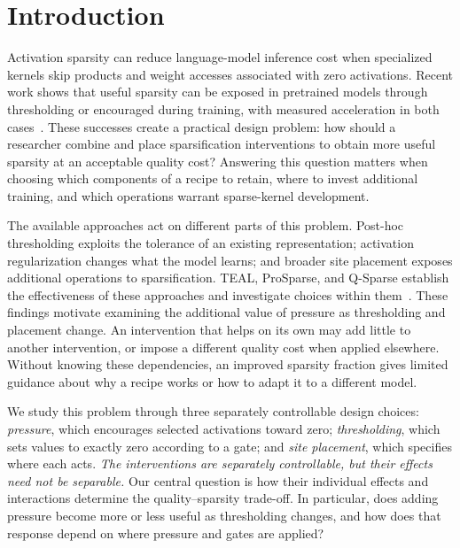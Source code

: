 \section{Introduction}
\label{sec:introduction}

Activation sparsity can reduce language-model inference cost when specialized
kernels skip products and weight accesses associated with zero activations.
Recent work shows that useful sparsity can be exposed in pretrained models
through thresholding or encouraged during training, with measured acceleration
in both cases~\citep{liu2024teal,cetin2026sparser}. These successes create a
practical design problem: how should a researcher combine and place
sparsification interventions to obtain more useful sparsity at an acceptable
quality cost? Answering this question matters when choosing which components
of a recipe to retain, where to invest additional training, and which
operations warrant sparse-kernel development.

The available approaches act on different parts of this problem. Post-hoc
thresholding exploits the tolerance of an existing representation;
activation regularization changes what the model learns; and broader site
placement exposes additional operations to sparsification. TEAL, ProSparse,
and Q-Sparse establish the effectiveness of these approaches and investigate
choices within them~\citep{liu2024teal,song2024prosparse,wang2024qsparse}.
These findings motivate examining the additional value of pressure as
thresholding and placement change.
An intervention that helps on its own may add little to another intervention,
or impose a different quality cost when applied elsewhere. Without knowing
these dependencies, an improved sparsity fraction gives limited guidance
about why a recipe works or how to adapt it to a different model.

We study this problem through three separately controllable design choices:
\emph{pressure}, which encourages selected activations toward zero;
\emph{thresholding}, which sets values to exactly zero according to a gate;
and \emph{site placement}, which specifies where each acts.
\emph{The interventions are separately controllable, but their effects need
not be separable.} Our central question is how their individual effects and
interactions determine the quality--sparsity trade-off. In particular, does
adding pressure become more or less useful as thresholding changes, and how
does that response depend on where pressure and gates are applied?

